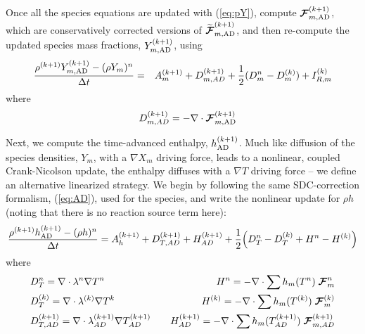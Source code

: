 Once all the species equations are updated with (\ref{eq:pY}), compute ${\boldsymbol{\cal F}}_{m,{\rm AD}}^{(k+1)}$,
which are conservatively corrected versions of $\widetilde{\boldsymbol{\cal F}}_{m,{\rm AD}}^{(k+1)}$,
and then re-compute the updated species mass fractions, $Y_{m,{\rm AD}}^{(k+1)}$, using
\begin{eqnarray}
  \frac{\rho^{(k+1)}Y_{m,{\rm AD}}^{(k+1)} - (\rho Y_m)^n}{\Delta t}
  &=& A_m^{{(k+1)}} + D_{m,AD}^{(k+1)} + \frac{1}{2}(D_m^n - D_m^{(k)}) + I_{R,m}^{(k)}
\end{eqnarray}
where
\begin{eqnarray*}
   &&D_{m,AD}^{(k+1)} = - \nabla \cdot {\boldsymbol{\cal F}}_{m,{\rm AD}}^{(k+1)}
\end{eqnarray*}

Next, we compute the time-advanced enthalpy, $h_{\rm AD}^{(k+1)}$.  Much like diffusion of the species densities,
$Y_m$, with a $\nabla X_m$ driving force, leads to a nonlinear, coupled Crank-Nicolson update, the
enthalpy diffuses with a $\nabla T$ driving force -- we define an alternative linearized strategy.
We begin by following the same SDC-correction formalism, (\ref{eq:AD}), used for the species, and write
the nonlinear update for $\rho h$ (noting that there is no reaction source term here):
\begin{equation}
  \frac{\rho^{(k+1)} h_{{\rm AD}}^{(k+1)} - (\rho h)^n}{\Delta t}
  = A_h^{(k+1)} + D_{T,AD}^{(k+1)} + H_{AD}^{(k+1)} + \frac{1}{2} \Big( D_T^n - D_T^{(k)} + H^n - H^{(k)} \Big)
 \label{eq:hup}
\end{equation}
where
\begin{eqnarray*}
  &D_T^n = \nabla \cdot \lambda^n \nabla T^n   \hspace{2cm}
  &H^n = - \nabla \cdot \sum h_m(T^n) \; {\boldsymbol{\cal F}}_m^n\\
  &D_T^{(k)} = \nabla \cdot \lambda^{(k)} \nabla T^{{k}}
  &H^{(k)} = - \nabla \cdot  \sum h_m(T^{(k)}) \; {\boldsymbol{\cal F}}_m^{(k)}\\
  &D_{T,AD}^{(k+1)} = \nabla \cdot \lambda_{AD}^{(k+1)} \nabla T_{AD}^{(k+1)}
  &H_{AD}^{(k+1)} = - \nabla \cdot \sum h_m(T_{AD}^{(k+1)}) \; {\boldsymbol{\cal F}}_{m,AD}^{(k+1)}
\end{eqnarray*}

